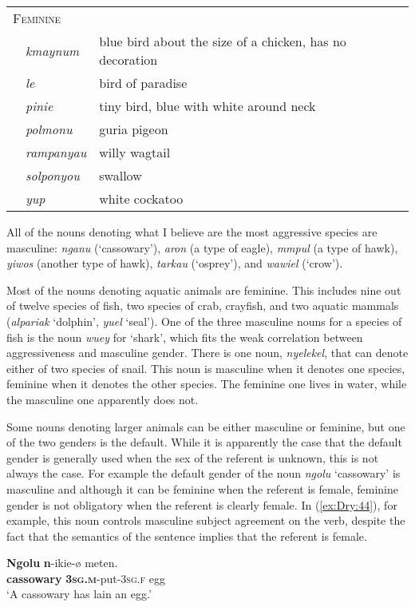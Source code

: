 \documentclass[output=collectionpaper]{langsci/langscibook}
\begin{document}
\begin{tabularx}{0.9\textwidth}{lp{1.8cm}X}
\multicolumn{3}{l}{ \textsc{Feminine}}\\
& \textit{kmaynum} & blue bird about the size of a chicken, has no decoration\\
& \textit{le} & bird of paradise\\
& \textit{pinie} & tiny bird, blue with white around neck\\
& \textit{polmonu} & guria pigeon\\
& \textit{rampanyau} & willy wagtail\\
& \textit{solponyou} & swallow\\
& \textit{yup} & white cockatoo\\
\end{tabularx}
\z

All of the nouns denoting what I believe are the most aggressive species are masculine: \textit{nganu} (`cassowary'), \textit{aron} (a type of eagle), \textit{mmpul} (a type of hawk), \textit{yiwos} (another type of hawk), \textit{tarkau} (`osprey'), and \textit{wawiel} (`crow').

Most of the nouns denoting aquatic animals are feminine. This includes nine out of twelve species of fish, two species of crab, crayfish, and two aquatic mammals (\textit{alpariak} `dolphin', \textit{yuel} `seal'). One of the three masculine nouns for a species of fish is the noun \textit{wuey} for `shark', which fits the weak correlation between aggressiveness and masculine gender. There is one noun, \textit{nyelekel}, that can denote either of two species of snail. This noun is masculine when it denotes one species, feminine when it denotes the other species. The feminine one lives in water, while the masculine one apparently does not.

Some nouns denoting larger animals can be either masculine or feminine, but one of the two genders is the default. While it is apparently the case that the default gender is generally used when the sex of the referent is unknown, this is not always the case. For example the default gender of the noun \textit{ngolu} `cassowary' is masculine and although it can be feminine when the referent is female, feminine gender is not obligatory when the referent is clearly female. In (\ref{ex:Dry:44}), for example, this noun controls masculine subject agreement on the verb, despite the fact that the semantics of the sentence implies that the referent is female.

\ea \label{ex:Dry:44}
\gll \textbf{Ngolu}	\textbf{n}-ikie-ø	meten.\\
\textbf{cassowary} \textbf{\textsc{3sg.m}}-put-\textsc{3sg.f} egg\\
\glt `A cassowary has lain an egg.'
\z
\end{document}
